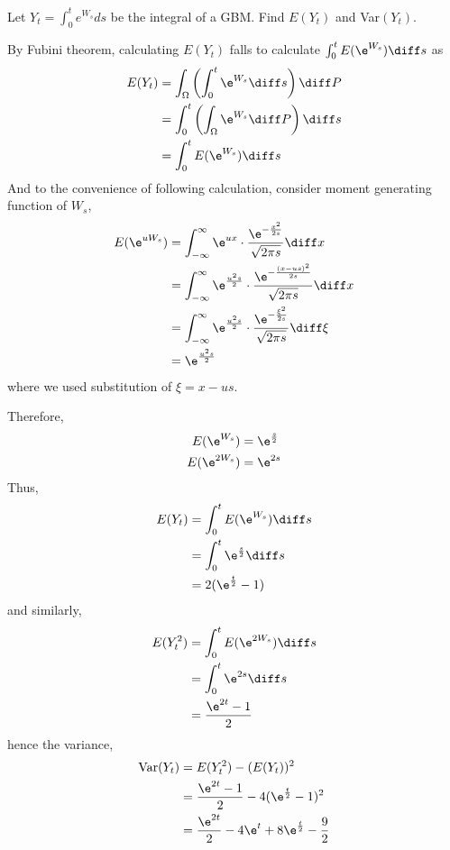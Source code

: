     \problem
    \begin{question}
        Let $Y_t=\int_0^t e^{W_s}ds$ be the integral of a GBM.
        Find $E(Y_t)$ and Var$(Y_t)$.
    \end{question}
    By Fubini theorem, calculating $E(Y_t)$ falls to
    calculate $\int_0^tE(\e^{W_s})\diff s$ as
    \[\begin{aligned}
    E(Y_t)&=\int_\Omega\left(\int_0^t\e^{W_s}\diff s\right)\diff P\\
    &=\int_0^t\left(\int_\Omega\e^{W_s}\diff P\right)\diff s\\
    &=\int_0^tE(\e^{W_s})\diff s \\
    \end{aligned}\]
    And to the convenience of following calculation, consider moment
    generating function of $W_s$,
    \begin{equation}
        \label{eq:mgf}
        \begin{aligned}
        E(\e^{uW_s})&=\int_{-\infty}^\infty\e^{ux}\cdot
        \frac{\e^{-\frac{x^2}{2s}}}{\sqrt{2\pi s}}\diff x\\
        &=\int_{-\infty}^\infty\e^{\frac{u^2s}{2}}
        \cdot\frac{\e^{-\frac{(x-us)^2}{2s}}}{\sqrt{2\pi s}}\diff x\\
        &=\int_{-\infty}^\infty\e^{\frac{u^2s}{2}}
        \cdot\frac{\e^{-\frac{\xi^2}{2s}}}{\sqrt{2\pi s}}\diff\xi\\
        &=\e^{\frac{u^2s}{2}}
        \end{aligned}
    \end{equation}
    where we used substitution of $\xi=x-us$.

    Therefore,
    \[\begin{aligned}
        E(\e^{W_s})&=\e^{\frac{s}{2}}\\
        E(\e^{2W_s})&=\e^{2s}\\
    \end{aligned}\]
    Thus,
    \[\begin{aligned}
        E(Y_t)&=\int_0^tE(\e^{W_s})\diff s\\
        &=\int_0^t\e^{\frac{s}{2}}\diff s\\
        &=2(\e^{\frac{t}{2}}-1)
    \end{aligned}\]
    and similarly,
    \[\begin{aligned}
        E(Y_t^2)&=\int_0^tE(\e^{2W_s})\diff s\\
        &=\int_0^t\e^{2s}\diff s\\
        &=\frac{\e^{2t}-1}{2}
    \end{aligned}\]
    hence the variance,
    \[\begin{aligned}
        \var(Y_t)&=E(Y_t^2)-(E(Y_t))^2\\
        &=\frac{\e^{2t}-1}{2}-4(\e^{\frac{t}{2}}-1)^2\\
        &=\frac{\e^{2t}}{2}-4\e^t+8\e^{\frac{t}{2}}-\frac{9}{2}
    \end{aligned}\]

